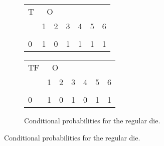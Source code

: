 \documentclass[10pt,]{scrartcl}
\begin{document}
\begin{figure}
\begin{subfigure}[!ht]{0.25\textwidth}
\begin{table}[H]
\centering
\begin{tabular}{lrrrrrr}
\toprule
\multicolumn{1}{c}{T} & \multicolumn{2}{c}{O} \\
  & 1 & 2 & 3 & 4 & 5 & 6\\
\midrule
\cellcolor{gray!6}{1} & \cellcolor{gray!6}{0} & \cellcolor{gray!6}{1} & \cellcolor{gray!6}{0} & \cellcolor{gray!6}{0} & \cellcolor{gray!6}{0} & \cellcolor{gray!6}{0}\\
0 & 1 & 0 & 1 & 1 & 1 & 1\\
\bottomrule
\end{tabular}
\end{table}

\begin{table}[H]
\centering
\begin{tabular}{lrrrrrr}
\toprule
\multicolumn{1}{c}{TF} & \multicolumn{2}{c}{O} \\
  & 1 & 2 & 3 & 4 & 5 & 6\\
\midrule
\cellcolor{gray!6}{1} & \cellcolor{gray!6}{0} & \cellcolor{gray!6}{1} & \cellcolor{gray!6}{0} & \cellcolor{gray!6}{1} & \cellcolor{gray!6}{0} & \cellcolor{gray!6}{0}\\
0 & 1 & 0 & 1 & 0 & 1 & 1\\
\bottomrule
\end{tabular}
\end{table}
\caption{Conditional probabilities for the regular die.}
\end{subfigure} \hfill
{}
\end{figure}
\end{document}

